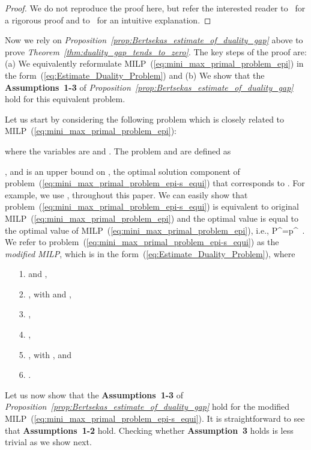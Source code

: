 \documentclass[journal, 10pt, twocolumn]{IEEEtran}
\newcommand{\be}{}
\begin{document}
\begin{proof}
We do not reproduce the proof here, but refer the interested reader to~\cite[\S~5.6.1, pp.~371-376]{Bertsekas-96} for a rigorous proof and to~\cite[\S~5.1.6]{Bertsekas-99} for an intuitive explanation. \end{proof}

Now we rely on \emph{Proposition~\ref{prop:Bertsekas_estimate_of_duality_gap}} above to prove \emph{Theorem~\ref{thm:duality_gap_tends_to_zero}}. The key steps of the proof are: (a) We equivalently reformulate MILP~(\ref{eq:mini_max_primal_problem_epi}) in the form~(\ref{eq:Estimate_Duality_Problem}) and (b) We show that the \textbf{Assumptions~1-3} of \emph{Proposition~\ref{prop:Bertsekas_estimate_of_duality_gap}} hold for this equivalent problem.


Let us start by considering the following problem which is closely related to MILP~(\ref{eq:mini_max_primal_problem_epi}):

where the variables are  and . The problem  and  are defined as


, and  is an upper bound on , the optimal solution component of problem~(\ref{eq:mini_max_primal_problem_epi-s_equi}) that corresponds to . For example, we use , throughout this paper. We can easily show that problem~(\ref{eq:mini_max_primal_problem_epi-s_equi}) is equivalent to original MILP~(\ref{eq:mini_max_primal_problem_epi}) and the optimal value  is equal to the optimal value  of MILP~(\ref{eq:mini_max_primal_problem_epi}), i.e.,
\be\label{eq:P_star_equal_p_star}
P^\star =p^\star \ .
\ee
We refer to problem~(\ref{eq:mini_max_primal_problem_epi-s_equi}) as the \emph{modified MILP}, which is in the form~(\ref{eq:Estimate_Duality_Problem}), where
\begin{enumerate}
\item[1.]  and ,
\item[2.] , with  and ,
\item[3.] ,
\item[4.] ,
\item[5.] , with , and
\item[6.] .
\end{enumerate}

Let us now show that the \textbf{Assumptions~1-3} of \emph{Proposition~\ref{prop:Bertsekas_estimate_of_duality_gap}} hold for the modified MILP~(\ref{eq:mini_max_primal_problem_epi-s_equi}). It is straightforward to see that \textbf{Assumptions~1-2} hold. Checking whether \textbf{Assumption~3} holds is less trivial as we show next.
\end{document}
